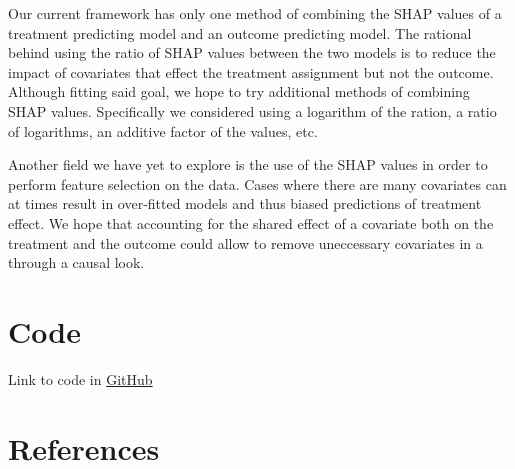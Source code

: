 \documentclass{article}
\begin{document}
Our current framework has only one method of combining the SHAP values of a treatment predicting model and an outcome predicting model. The rational behind using the ratio of SHAP values between the two models is to reduce the impact of covariates that effect the treatment assignment but not the outcome. Although fitting said goal, we hope to try additional methods of combining SHAP values. Specifically we considered using a logarithm of the ration, a ratio of logarithms, an additive factor of the values, etc. 

Another field we have yet to explore is the use of the SHAP values in order to perform feature selection on the data. Cases where there are many covariates can at times result in over-fitted models and thus biased predictions of treatment effect. We hope that accounting for the shared effect of a covariate both on the treatment and the outcome could allow to remove uneccessary covariates in a through a causal look. 
\section{Code}
Link to code in \href{https://github.com/kalkairis/causal_inference_2018}{GitHub}
\section{References}



\end{document}
